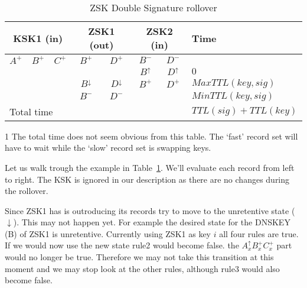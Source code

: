 \documentclass[twoside, a4paper]{article}
\begin{document}
\begin{table}[h]
	\centering
	\begin{threeparttable} 
		
		\begin{tabular}{ |ccc|cc|cc|l| }
		\hline
		\multicolumn{3}{|c|}{KSK1 (in)} & \multicolumn{2}{c|}{ZSK1 (out)} & \multicolumn{2}{c|}{ZSK2 (in)} & Time\\
		\hline
		$A^{+}$ & $B^{+}$ & $C^{+}$ & $B^{+}$          & $D^{+}$          & $B^{-}$        & $D^{-}$        & \\
				&         &         &                  &                  & $B^{\uparrow}$ & $D^{\uparrow}$ & $0$\\
				&         &         & $B^{\downarrow}$ & $D^{\downarrow}$ & $B^{+}$        & $D^{+}$        & $MaxTTL(key, sig)$\\
				&         &         & $B^{-}$          & $D^{-}$          &                &                & $MinTTL(key, sig)$\\
		\hline
		\multicolumn{7}{|l|}{Total time} & $TTL(sig) + TTL(key)$\tnote{1}\\
		\hline
		\end{tabular}
		
		\begin{tablenotes}[para]
		\item[1] The total time does not seem obvious from this table.
			The `fast' record set will have to wait while the `slow'
			record set is swapping keys.
		\end{tablenotes}
		
	\end{threeparttable}
	\caption{ZSK Double Signature rollover}
	\label{tab:roll_dubsig}
\end{table}

Let us walk trough the example in Table~\ref{tab:roll_dubsig}. We'll 
evaluate each record from left to right. The KSK is ignored in our 
description as there are no changes during the rollover.

Since ZSK1 has is outroducing its records try to move to the 
unretentive state ($\downarrow$). This may not happen yet. For 
example the desired state for the DNSKEY (B) of ZSK1 is unretentive. 
Currently using ZSK1 as key $i$ all four rules are true. If we would 
now use the new state rule2 would become false.  the 
$A_{x}^{\uparrow}B_{x}^{+} C_{x}^{+}$ part would no longer be true.
Therefore we may not take this transition at this moment and we may
stop look at the other rules, although rule3 would also become false.
\end{document}
